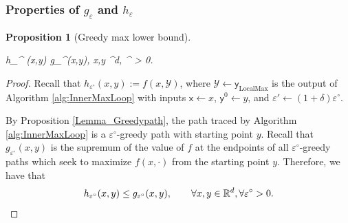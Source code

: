 \documentclass[11pt,letterpaper]{article}
\renewcommand{\epsilon}{\varepsilon}
\newtheorem{proposition}[theorem]{Proposition}
\def \be{\begin{equs}}
\def \ee{\end{equs}}
\begin{document}
\bigskip
\subsubsection{Properties of $g_\epsilon$ and $h_\epsilon$}



 
 
 \begin{proposition}[{Greedy max lower bound}]\label{Prop_lower_bound}
  \be \label{eq:z2}
  h_{\epsilon^{\circ}} (x,y) \leq g_{\epsilon^{\circ}}(x,y), \qquad \forall x,y \in {}^d,  \forall \epsilon^{\circ} > 0.
  \ee
 \end{proposition}
 
 
 \begin{proof} Recall that  $h_{\epsilon^{\circ}} (x,y):= f(x,\mathcal{Y})$, where $\mathcal{Y} \leftarrow \mathsf{y}_{\mathrm{LocalMax}}$ is the output of Algorithm \ref{alg:InnerMaxLoop} with inputs $\mathsf{x} \leftarrow x$, $\mathsf{y}^0 \leftarrow y$, and $\epsilon' \leftarrow (1+\delta)\epsilon^{\circ}$.
 
  By Proposition \ref{Lemma_Greedypath}, the path traced by Algorithm \ref{alg:InnerMaxLoop} is a $\epsilon^{\circ}$-greedy path with starting point $y$.  Recall that $ g_{\epsilon^{\circ}}(x,y)$ is the supremum of the value of $f$ at the endpoints of all  $\epsilon^{\circ}$-greedy paths which seek to maximize $f(x, \cdot)$ from the starting point $y$.  Therefore, we have that
 \begin{equation*}
  h_{\epsilon^{\circ}} (x,y) \leq g_{\epsilon^{\circ}}(x,y), \qquad \forall x,y \in \mathbb{R}^d,  \forall \epsilon^{\circ} > 0.  \qedhere
  \end{equation*}
 \end{proof}
 
\end{document}
